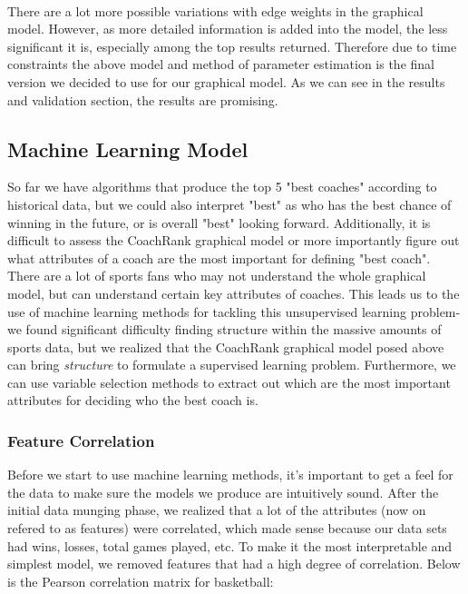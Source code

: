 \documentclass[titlepage,11pt]{article}
\begin{document}
\noindent 
\\

\noindent There are a lot more possible variations with edge weights in the graphical model. However, as more detailed information is added into the model, the less significant it is, especially among the top results returned. Therefore due to time constraints the above model and method of parameter estimation is the final version we decided to use for our graphical model. As we can see in the results and validation section, the results are promising.

\subsection{Machine Learning Model}

\noindent So far we have algorithms that produce the top 5 "best coaches" according to historical data, but we could also interpret "best" as who has the best chance of winning in the future, or is overall "best" looking forward. Additionally, it is difficult to assess the CoachRank graphical model or more importantly figure out what attributes of a coach are the most important for defining "best coach". There are a lot of sports fans who may not understand the whole graphical model, but can understand certain key attributes of coaches. This leads us to the use of machine learning methods for tackling this unsupervised learning problem- we found significant difficulty finding structure within the massive amounts of sports data, but we realized that the CoachRank graphical model posed above can bring \textit{structure} to formulate a supervised learning problem. Furthermore, we can use variable selection methods to extract out which are the most important attributes for deciding who the best coach is. 

\subsubsection*{Feature Correlation}

\noindent Before we start to use machine learning methods, it's important to get a feel for the data to make sure the models we produce are intuitively sound. After the initial data munging phase, we realized that a lot of the attributes (now on refered to as features) were correlated, which made sense because our data sets had wins, losses, total games played, etc. To make it the most interpretable and simplest model, we removed features that had a high degree of correlation. Below is the Pearson correlation matrix for basketball: 
\end{document}
